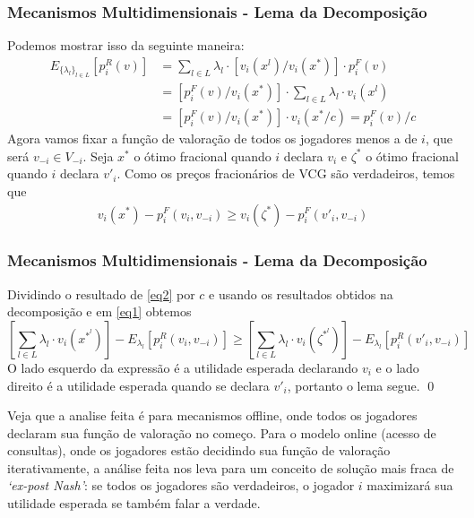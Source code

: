 \documentclass{beamer}
\begin{document}
\begin{frame}
    \frametitle{Mecanismos Multidimensionais - Lema da Decomposição}
    Podemos mostrar isso da seguinte maneira:
    \begin{equation} \label{eq1}
    \begin{align*}
        E_{\{\lambda_l\}_{l \in L}}[p_i^R(v)] &= \sum_{l \in L} \lambda_l \cdot [v_i(x^l) / v_i(x^*)] \cdot p_i^F(v) \\
        &= [p_i^F(v)/v_i(x^*)] \cdot \sum_{l \in L} \lambda_l \cdot v_i(x^l) \\
        &= [p_i^F(v)/v_i(x^*)] \cdot v_i(x^* / c) = p_i^F(v) / c
    \end{align*}
    \end{equation}
    Agora vamos fixar a função de valoração de todos os jogadores menos a de $i$, que será $v_{-i} \in V_{-i}$. Seja $x^*$ o ótimo fracional quando $i$ declara $v_i$ e $\zeta^*$ o ótimo fracional quando $i$ declara $v'_i$. Como os preços fracionários de VCG são verdadeiros, temos que
    \begin{equation} \label{eq2}
    \begin{align*}
        v_i(x^*) - p_i^F(v_i, v_{-i}) \geq v_i(\zeta^*) - p_i^F(v'_i, v_{-i})
    \end{align*}
    \end{equation}
\end{frame}

\begin{frame}
    \frametitle{Mecanismos Multidimensionais - Lema da Decomposição}
    Dividindo o resultado de \ref{eq2} por $c$ e usando os resultados obtidos na decomposição e em \ref{eq1} obtemos
    $$
        \left[ \sum_{l \in L} \lambda_l \cdot v_i(x^{*^l}) \right] - E_{\lambda_l}[p_i^R(v_i, v_{-i})] \geq \left[ \sum_{l \in L} \lambda_l \cdot v_i(\zeta^{*^l}) \right] - E_{\lambda_l}[p_i^R(v'_i, v_{-i})]
    $$
    O lado esquerdo da expressão é a utilidade esperada declarando $v_i$ e o lado direito é a utilidade esperada quando se declara $v'_i$, portanto o lema segue. \qed

    Veja que a analise feita é para mecanismos offline, onde todos os jogadores declaram sua função de valoração no começo. Para o modelo online (acesso de consultas), onde os jogadores estão decidindo sua função de valoração iterativamente, a análise feita nos leva para um conceito de solução mais fraca de \textit{`ex-post Nash'}: se todos os jogadores são verdadeiros, o jogador $i$ maximizará sua utilidade esperada se também falar a verdade.
\end{frame}
\end{document}
